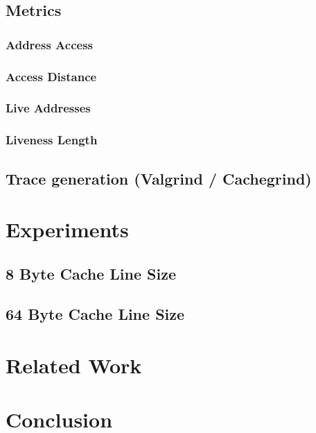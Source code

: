 \documentclass[onecolumn, openany, master, english, seal, signatures]{dbrgrptt}
\begin{document}
\section{Metrics}
\subsection{Address Access}
\subsection{Access Distance}
\subsection{Live Addresses}
\subsection{Liveness Length}

\section{Trace generation (Valgrind / Cachegrind)}

\chapter{Experiments}\label{cha:experimetns}
\section{8 Byte Cache Line Size}
\section{64 Byte Cache Line Size}


\chapter{Related Work}\label{cha:related-work}

\chapter{Conclusion}\label{cha:conclusion}
\end{document}
